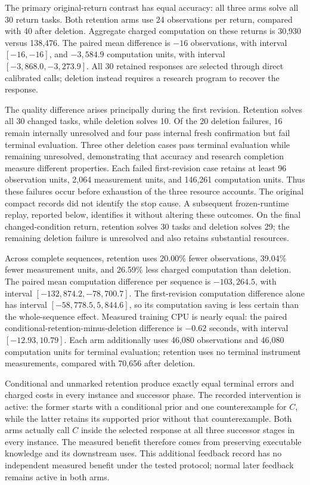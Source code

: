 \documentclass[twoside,11pt]{article}
\begin{document}
The primary original-return contrast has equal accuracy: all three arms solve all 30 return tasks. Both retention arms use 24 observations per return, compared with 40 after deletion. Aggregate charged computation on these returns is 30,930 versus 138,476. The paired mean difference is \(-16\) observations, with interval \([-16,-16]\), and \(-3{,}584.9\) computation units, with interval \([-3{,}868.0,-3{,}273.9]\). All 30 retained responses are selected through direct calibrated calls; deletion instead requires a research program to recover the response.


The quality difference arises principally during the first revision. Retention solves all 30 changed tasks, while deletion solves 10. Of the 20 deletion failures, 16 remain internally unresolved and four pass internal fresh confirmation but fail terminal evaluation. Three other deletion cases pass terminal evaluation while remaining unresolved, demonstrating that accuracy and research completion measure different properties. Each failed first-revision case retains at least 96 observation units, 2,064 measurement units, and 146,261 computation units. Thus these failures occur before exhaustion of the three resource accounts. The original compact records did not identify the stop cause. A subsequent frozen-runtime replay, reported below, identifies it without altering these outcomes. On the final changed-condition return, retention solves 30 tasks and deletion solves 29; the remaining deletion failure is unresolved and also retains substantial resources.


Across complete sequences, retention uses 20.00\% fewer observations, 39.04\% fewer measurement units, and 26.59\% less charged computation than deletion. The paired mean computation difference per sequence is \(-103{,}264.5\), with interval \([-132{,}874.2,-78{,}700.7]\). The first-revision computation difference alone has interval \([-58{,}778.5,5{,}844.6]\), so its computation saving is less certain than the whole-sequence effect. Measured training CPU is nearly equal: the paired conditional-retention-minus-deletion difference is \(-0.62\) seconds, with interval \([-12.93,10.79]\). Each arm additionally uses 46,080 observations and 46,080 computation units for terminal evaluation; retention uses no terminal instrument measurements, compared with 70,656 after deletion.


Conditional and unmarked retention produce exactly equal terminal errors and charged costs in every instance and successor phase. The recorded intervention is active: the former starts with a conditional prior and one counterexample for \(C\), while the latter retains its supported prior without that counterexample. Both arms actually call \(C\) inside the selected response at all three successor stages in every instance. The measured benefit therefore comes from preserving executable knowledge and its downstream uses. This additional feedback record has no independent measured benefit under the tested protocol; normal later feedback remains active in both arms.
\end{document}
